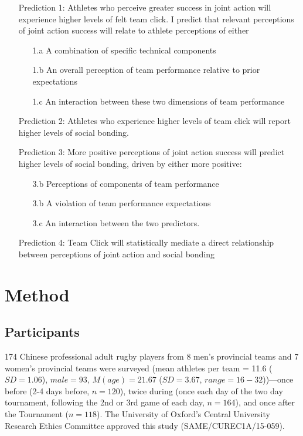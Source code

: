 \begin{CJK}{UTF8}{gbsn}
\begin{itemize}
  \item[Prediction 1:] Athletes who perceive greater success in joint action will experience higher levels of felt team click. I predict that relevant perceptions of joint action success will relate to athlete perceptions of either
      \begin{itemize}
        \item[1.a] A combination of specific technical components
        \item[1.b] An overall perception of team performance relative to prior expectations
        \item[1.c] An interaction between these two dimensions of team performance
      \end{itemize}
  \item[Prediction 2:] Athletes who experience higher levels of team click will report higher levels of social bonding.
  \item[Prediction 3:] More positive perceptions of joint action success will predict higher levels of social bonding, driven by either more positive:
    \begin{itemize}
        \item[3.b] Perceptions of components of team performance
    	  \item[3.b] A violation of team performance expectations
        \item[3.c] An interaction between the two predictors.
    \end{itemize}
  \item[Prediction 4:] Team Click will statistically mediate a direct relationship between perceptions of joint action and social bonding
\end{itemize}



\clearpage

\section{Method}
\subsection{Participants}
174 Chinese professional adult rugby players from 8 men’s provincial teams and 7 women’s provincial teams were surveyed  (mean athletes per team = 11.6 ($SD =1.06$), $male = 93$, $M(age) = 21.67$ ($SD = 3.67$, $range = 16 - 32$))---once before (2-4 days before, $n = 120$), twice during (once each day of the two day tournament, following the 2nd or 3rd game of each day, $n = 164$), and once after the Tournament ($n = 118$).  The University of Oxford’s Central University Research Ethics Committee approved this study (SAME/CUREC1A/15-059).


\end{CJK}
